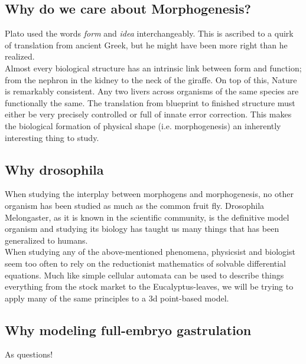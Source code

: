 \subsection{Why do we care about Morphogenesis?}
Plato used the words \textit{form} and \textit{idea} interchangeably. This is ascribed to a quirk of translation from ancient Greek, but he might have been more right than he realized.\\ Almost every biological structure has an intrinsic link between form and function; from the nephron in the kidney to the neck of the giraffe.  
On top of this, Nature is remarkably consistent. Any two livers across organisms of the same species are functionally the same. The translation from blueprint to finished structure must either be very precisely controlled or full of innate error correction. This makes the biological formation of physical shape (i.e. morphogenesis) an inherently interesting thing to study. 

\subsection{Why drosophila}
When studying the interplay between morphogens and morphogenesis, no other organism has been studied as much as the common fruit fly. Drosophila Melongaster, as it is known in the scientific community, is the definitive model organism and studying its biology has taught us many things that has been generalized to humans. \\


When studying any of the above-mentioned phenomena, physicsist and biologist seem too often to rely on the reductionist mathematics of solvable differential equations. Much like simple cellular automata can be used to describe things everything from the stock market to the Eucalyptus-leaves, we will be trying to apply many of the same principles to a 3d point-based model.

\subsection{Why modeling full-embryo gastrulation }
As questions!








